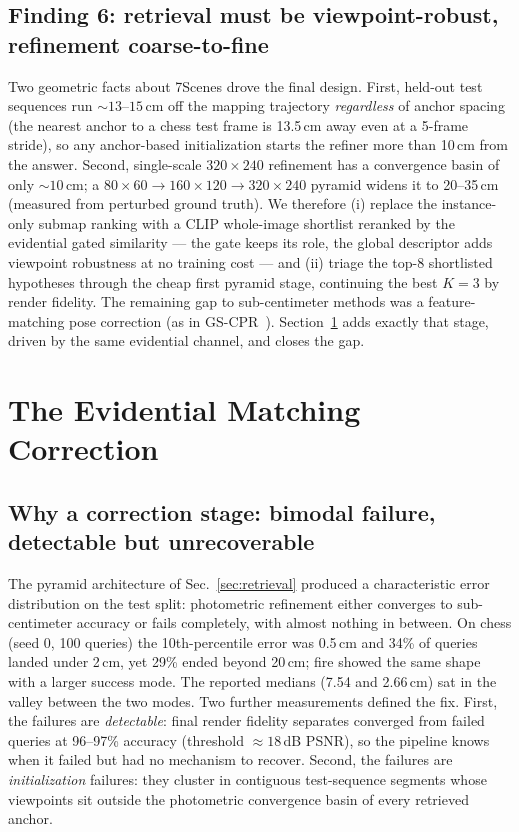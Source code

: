 \documentclass[journal]{IEEEtran}
\begin{document}
\subsection{Finding 6: retrieval must be viewpoint-robust, refinement
coarse-to-fine}
Two geometric facts about 7Scenes drove the final design. First, held-out
test sequences run ${\sim}13$--$15$\,cm off the mapping trajectory
\emph{regardless} of anchor spacing (the nearest anchor to a chess test frame
is 13.5\,cm away even at a 5-frame stride), so any anchor-based initialization
starts the refiner more than 10\,cm from the answer. Second, single-scale
$320{\times}240$ refinement has a convergence basin of only ${\sim}10$\,cm; a
$80{\times}60 \to 160{\times}120 \to 320{\times}240$ pyramid widens it to
20--35\,cm (measured from perturbed ground truth). We therefore (i) replace
the instance-only submap ranking with a CLIP whole-image shortlist reranked
by the evidential gated similarity --- the gate keeps its role, the global
descriptor adds viewpoint robustness at no training cost --- and (ii) triage
the top-8 shortlisted hypotheses through the cheap first pyramid stage,
continuing the best $K{=}3$ by render fidelity. The remaining gap to
sub-centimeter methods was a feature-matching pose correction (as in
GS-CPR~\cite{gscpr}). Section~\ref{sec:correction-full} adds exactly that
stage, driven by the same evidential channel, and closes the gap.

\section{The Evidential Matching Correction}
\label{sec:correction-full}

\subsection{Why a correction stage: bimodal failure, detectable but
unrecoverable}
The pyramid architecture of Sec.~\ref{sec:retrieval} produced a
characteristic error distribution on the test split: photometric refinement
either converges to sub-centimeter accuracy or fails completely, with almost
nothing in between. On chess (seed 0, 100 queries) the 10th-percentile error
was 0.5\,cm and 34\% of queries landed under 2\,cm, yet 29\% ended beyond
20\,cm; fire showed the same shape with a larger success mode. The reported medians (7.54 and 2.66\,cm) sat in the valley between the two modes. Two
further measurements defined the fix. First, the failures are
\emph{detectable}: final render fidelity separates converged from failed
queries at 96--97\% accuracy (threshold ${\approx}18$\,dB PSNR), so the
pipeline knows when it failed but had no mechanism to recover. Second, the
failures are \emph{initialization} failures: they cluster in contiguous
test-sequence segments whose viewpoints sit outside the photometric
convergence basin of every retrieved anchor.
\end{document}
